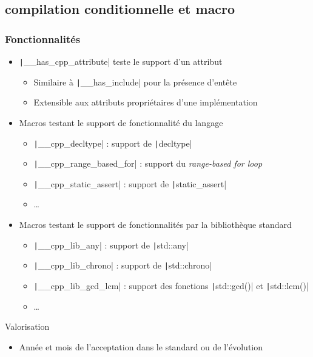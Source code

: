 \documentclass[C++.tex]{subfiles}
\begin{document}
\subsection*{compilation conditionnelle et macro}
\begin{frame}[fragile]
	\frametitle{Fonctionnalités}
	\begin{itemize}
		\item \texttt|__has_cpp_attribute| teste le support d'un attribut
		\begin{itemize}
			\item Similaire à \texttt|__has_include| pour la présence d'entête
			\item Extensible aux attributs propriétaires d'une implémentation
		\end{itemize}
		\item Macros testant le support de fonctionnalité du langage
		\begin{itemize}
			\item \texttt|__cpp_decltype| : support de \texttt|decltype|
			\item \texttt|__cpp_range_based_for| : support du \textit{range-based for loop}
			\item \texttt|__cpp_static_assert| : support de \texttt|static_assert|
			\item \ldots{}
		\end{itemize}
		\item Macros testant le support de fonctionnalités par la bibliothèque standard
		\begin{itemize}
			\item \texttt|__cpp_lib_any| : support de \texttt|std::any|
			\item \texttt|__cpp_lib_chrono| : support de \texttt|std::chrono|
			\item \texttt|__cpp_lib_gcd_lcm| : support des fonctions \texttt|std::gcd()| et \texttt|std::lcm()|
			\item \ldots{}
		\end{itemize}
	\end{itemize}

	\begin{block}{Valorisation}
		\begin{itemize}
			\item Année et mois de l'acceptation dans le standard ou de l'évolution

		\end{itemize}
	\end{block}


\end{frame}
\end{document}
